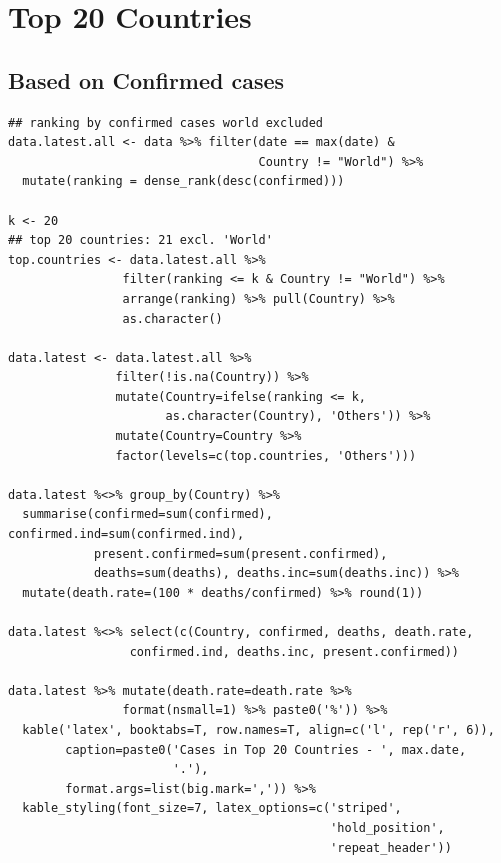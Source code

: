 \section{Top 20 Countries}

\subsection{Based on Confirmed cases}

\begin{verbatim}
## ranking by confirmed cases world excluded
data.latest.all <- data %>% filter(date == max(date) & 
                                   Country != "World") %>%
  mutate(ranking = dense_rank(desc(confirmed)))

k <- 20
## top 20 countries: 21 excl. 'World'
top.countries <- data.latest.all %>% 
                filter(ranking <= k & Country != "World") %>%
                arrange(ranking) %>% pull(Country) %>% 
                as.character()

data.latest <- data.latest.all %>% 
               filter(!is.na(Country)) %>%
               mutate(Country=ifelse(ranking <= k,
                      as.character(Country), 'Others')) %>%
               mutate(Country=Country %>% 
               factor(levels=c(top.countries, 'Others')))

data.latest %<>% group_by(Country) %>%
  summarise(confirmed=sum(confirmed), confirmed.ind=sum(confirmed.ind),
            present.confirmed=sum(present.confirmed), 
            deaths=sum(deaths), deaths.inc=sum(deaths.inc)) %>%
  mutate(death.rate=(100 * deaths/confirmed) %>% round(1))

data.latest %<>% select(c(Country, confirmed, deaths, death.rate,
                 confirmed.ind, deaths.inc, present.confirmed))

data.latest %>% mutate(death.rate=death.rate %>% 
                format(nsmall=1) %>% paste0('%')) %>%
  kable('latex', booktabs=T, row.names=T, align=c('l', rep('r', 6)),
        caption=paste0('Cases in Top 20 Countries - ', max.date,
                       '.'),
        format.args=list(big.mark=',')) %>%
  kable_styling(font_size=7, latex_options=c('striped', 
                                             'hold_position', 
                                             'repeat_header'))
\end{verbatim}

